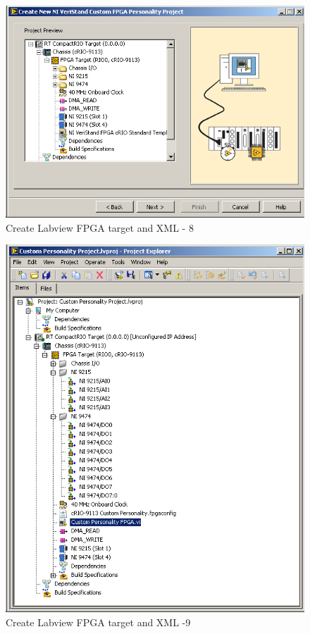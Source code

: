 \documentclass[a4paper,twoside,english]{report}
\begin{document}
\begin{figure}[!h]
\centering \includegraphics[scale=0.45]{Screenshots/Screenshot_2015-01-16_19-25-54.png}
\caption{Create Labview FPGA target and XML - 8}

\label{fig: Create Labview FPGA target and XML-8} 
\end{figure}

\begin{figure}[!h]
\centering \includegraphics[scale=0.45]{Screenshots/Screenshot_2015-01-16_19-28-17.png}
\caption{Create Labview FPGA target and XML -9}

\label{fig: Create Labview FPGA target and XML-9} 
\end{figure}
\end{document}
